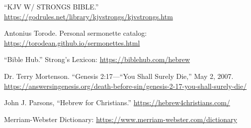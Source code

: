 {\footnotesize
\begin{thebibliography}{99}
	
	 ``KJV W/ STRONGS BIBLE.'' \url{https://godrules.net/library/kjvstrongs/kjvstrongs.htm}
	
	 Antonius Torode. Personal sermonette catalog: \url{https://torodean.github.io/sermonettes.html}
	
	 ``Bible Hub.'' Strong's Lexicon: \url{https://biblehub.com/hebrew}
	
	 Dr. Terry Mortenson. ``Genesis 2:17—“You Shall Surely Die,'' May 2, 2007.  \url{https://answersingenesis.org/death-before-sin/genesis-2-17-you-shall-surely-die/}
	
	 John J. Parsons, ``Hebrew for Christians.'' \url{https://hebrew4christians.com/}
	
	 Merriam-Webster Dictionary: \url{https://www.merriam-webster.com/dictionary}
	
\end{thebibliography}
}
